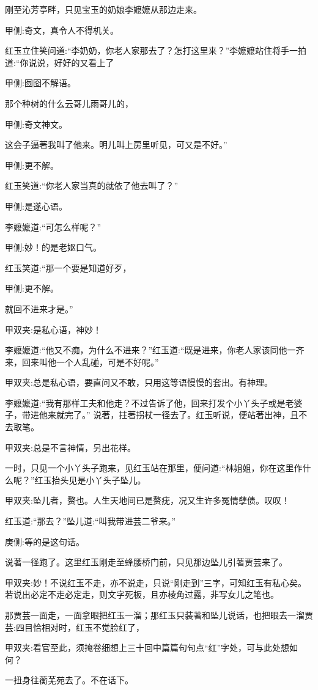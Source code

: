\begin{parag}
    刚至沁芳亭畔，只见宝玉的奶娘李嬷嬷从那边走来。\begin{note}甲侧:奇文，真令人不得机关。\end{note}红玉立住笑问道:“李奶奶，你老人家那去了？怎打这里来？”李嬷嬷站住将手一拍道:“你说说，好好的又看上了\begin{note}甲侧:囫囵不解语。\end{note}那个种树的什么云哥儿雨哥儿的，\begin{note}甲侧:奇文神文。\end{note}这会子逼著我叫了他来。明儿叫上房里听见，可又是不好。”\begin{note}甲侧:更不解。\end{note}红玉笑道:“你老人家当真的就依了他去叫了？”\begin{note}甲侧:是遂心语。\end{note}李嬷嬷道:“可怎么样呢？”\begin{note}甲侧:妙！的是老妪口气。\end{note}红玉笑道:“那一个要是知道好歹，\begin{note}甲侧:更不解。\end{note}就回不进来才是。”\begin{note}甲双夹:是私心语，神妙！\end{note}李嬷嬷道:“他又不痴，为什么不进来？”红玉道:“既是进来，你老人家该同他一齐来，回来叫他一个人乱碰，可是不好呢。”\begin{note}甲双夹:总是私心语，要直问又不敢，只用这等语慢慢的套出。有神理。\end{note}李嬷嬷道:“我有那样工夫和他走？不过告诉了他，回来打发个小丫头子或是老婆子，带进他来就完了。” 说著，拄著拐杖一径去了。红玉听说，便站著出神，且不去取笔。\begin{note}甲双夹:总是不言神情，另出花样。\end{note}
\end{parag}


\begin{parag}
    一时，只见一个小丫头子跑来，见红玉站在那里，便问道:“林姐姐，你在这里作什么呢？”红玉抬头见是小丫头子坠儿。\begin{note}甲双夹:坠儿者，赘也。人生天地间已是赘疣，况又生许多冤情孽债。叹叹！\end{note}红玉道:“那去？”坠儿道:“叫我带进芸二爷来。”\begin{note}庚侧:等的是这句话。\end{note}说著一径跑了。这里红玉刚走至蜂腰桥门前，只见那边坠儿引著贾芸来了。\begin{note}甲双夹:妙！不说红玉不走，亦不说走，只说“刚走到”三字，可知红玉有私心矣。若说出必定不走必定走，则文字死板，且亦棱角过露，非写女儿之笔也。\end{note}那贾芸一面走，一面拿眼把红玉一溜；那红玉只装著和坠儿说话，也把眼去一溜贾芸:四目恰相对时，红玉不觉脸红了，\begin{note}甲双夹:看官至此，须掩卷细想上三十回中篇篇句句点“红”字处，可与此处想如何？\end{note}一扭身往蘅芜苑去了。不在话下。
\end{parag}


